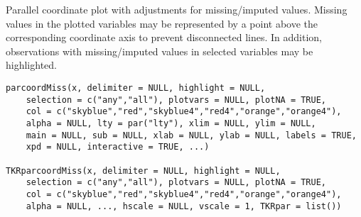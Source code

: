 %
\begin{Description}\relax
Parallel coordinate plot with adjustments for missing/imputed values. Missing values 
in the plotted variables may be represented by a point above the 
corresponding coordinate axis to prevent disconnected lines. In addition, 
observations with missing/imputed values in selected variables may be highlighted.
\end{Description}
%
\begin{Usage}
\begin{verbatim}
parcoordMiss(x, delimiter = NULL, highlight = NULL,
    selection = c("any","all"), plotvars = NULL, plotNA = TRUE,
    col = c("skyblue","red","skyblue4","red4","orange","orange4"),
    alpha = NULL, lty = par("lty"), xlim = NULL, ylim = NULL,
    main = NULL, sub = NULL, xlab = NULL, ylab = NULL, labels = TRUE,
    xpd = NULL, interactive = TRUE, ...)

TKRparcoordMiss(x, delimiter = NULL, highlight = NULL,
    selection = c("any","all"), plotvars = NULL, plotNA = TRUE,
    col = c("skyblue","red","skyblue4","red4","orange","orange4"),
    alpha = NULL, ..., hscale = NULL, vscale = 1, TKRpar = list())
\end{verbatim}
\end{Usage}
%
